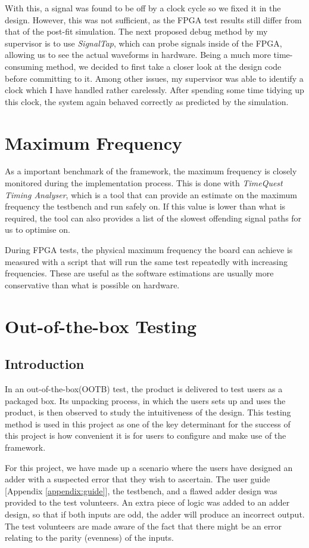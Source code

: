 With this, a signal was found to be off by a clock cycle so we fixed it in the design.
However, this was not sufficient, as the FPGA test results still differ from that of the post-fit simulation.
The next proposed debug method by my supervisor is to use \textit{SignalTap}, which can probe signals inside of the FPGA, allowing us to see the actual waveforms in hardware.
Being a much more time-consuming method, we decided to first take a closer look at the design code before committing to it.
Among other issues, my supervisor was able to identify a clock which I have handled rather carelessly.
After spending some time tidying up this clock, the system again behaved correctly as predicted by the simulation.

\section{Maximum Frequency}
As a important benchmark of the framework, the maximum frequency is closely monitored during the implementation process.
This is done with \textit{TimeQuest Timing Analyser}, which is a tool that can provide an estimate on the maximum frequency the testbench and run safely on.
If this value is lower than what is required, the tool can also provides a list of the slowest offending signal paths for us to optimise on.

During FPGA tests, the physical maximum frequency the board can achieve is measured with a script that will run the same test repeatedly with increasing frequencies.
These are useful as the software estimations are usually more conservative than what is possible on hardware.

\section{Out-of-the-box Testing}
\subsection{Introduction}
In an out-of-the-box(OOTB) test, the product is delivered to test users as a packaged box.
Its unpacking process, in which the users sets up and uses the product, is then observed to study the intuitiveness of the design.
This testing method is used in this project as one of the key determinant for the success of this project is how convenient it is for users to configure and make use of the framework.

For this project, we have made up a scenario where the users have designed an adder with a suspected error that they wish to ascertain.
The user guide [Appendix \ref{appendix:guide}], the testbench, and a flawed adder design was provided to the test volunteers.
An extra piece of logic was added to an adder design, so that if both inputs are odd, the adder will produce an incorrect output.
The test volunteers are made aware of the fact that there might be an error relating to the parity (evenness) of the inputs.

